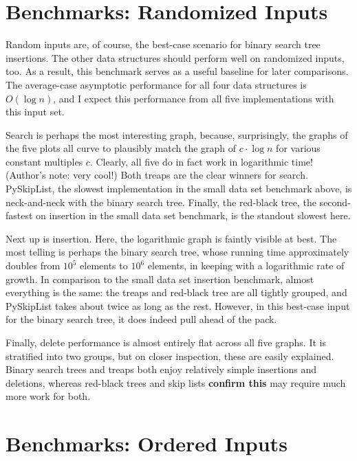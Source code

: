 \documentclass{article}
\newcommand {\todo}[1] {{\textbf{\color{red}#1}}}
\begin{document}
\section{Benchmarks: Randomized Inputs}
Random inputs are, of course, the best-case scenario for binary search tree insertions. The other data structures should perform well on randomized inputs, too. As a result, this benchmark serves as a useful baseline for later comparisons. The average-case asymptotic performance for all four data structures is $O(\log n)$, and I expect this performance from all five implementations with this input set.



Search is perhaps the most interesting graph, because, surprisingly, the graphs of the five plots all curve to plausibly match the graph of $c \cdot \log n$ for various constant multiples $c$. Clearly, all five do in fact work in logarithmic time! (Author's note: very cool!) Both treaps are the clear winners for search. PySkipList, the slowest implementation in the small data set benchmark above, is neck-and-neck with the binary search tree. Finally, the red-black tree, the second-fastest on insertion in the small data set benchmark, is the standout slowest here.



Next up is insertion. Here, the logarithmic graph is faintly visible at best. The most telling is perhaps the binary search tree, whose running time approximately doubles from $10^5$ elements to $10^6$ elements, in keeping with a logarithmic rate of growth.  In comparison to the small data set insertion benchmark, almost everything is the same: the treaps and red-black tree are all tightly grouped, and PySkipList takes about twice as long as the rest. However, in this best-case input for the binary search tree, it does indeed pull ahead of the pack.



Finally, delete performance is almost entirely flat across all five graphs. It is stratified into two groups, but on closer inspection, these are easily explained. Binary search trees and treaps both enjoy relatively simple insertions and deletions, whereas red-black trees and skip lists \todo{confirm this} may require much more work for both.

\section{Benchmarks: Ordered Inputs}
\end{document}
